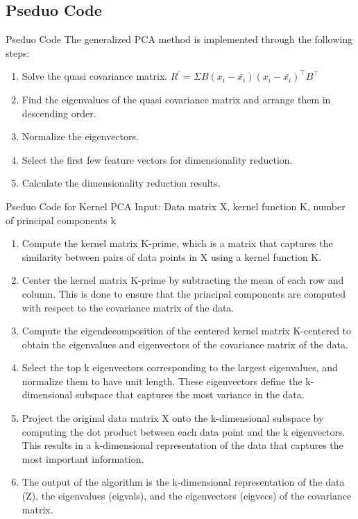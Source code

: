 \documentclass{beamer}
\begin{document}
\subsection{Pseduo Code}
\begin{frame}{Pseduo Code}
    The generalized PCA method is implemented through the following steps:
    \begin{enumerate}
    \item Solve the quasi covariance matrix. \newline
    $R^\prime = \Sigma B(x_i - \bar{x_i})(x_i - \bar{x_i})^\top B^\top$
    \item Find the eigenvalues of the quasi covariance matrix and arrange them in descending order.
    \item Normalize the eigenvectors.
    \item Select the first few feature vectors for dimensionality reduction.
    \item Calculate the dimensionality reduction results.
    \end{enumerate}
\end{frame}

\begin{frame}[allowframebreaks]{Pseduo Code for Kernel PCA}
    Input: Data matrix X, kernel function K, \newline number of principal components k
    \begin{enumerate}
    \item Compute the kernel matrix K-prime, which is a matrix that captures the similarity between pairs of data points in X using a kernel function K.
    \item Center the kernel matrix K-prime by subtracting the mean of each row and column. This is done to ensure that the principal components are computed with respect to the covariance matrix of the data.
    \item Compute the eigendecomposition of the centered kernel matrix K-centered to obtain the eigenvalues and eigenvectors of the covariance matrix of the data.
    \item Select the top k eigenvectors corresponding to the largest eigenvalues, and normalize them to have unit length. These eigenvectors define the k-dimensional subspace that captures the most variance in the data.
    \item Project the original data matrix X onto the k-dimensional subspace by computing the dot product between each data point and the k eigenvectors. This results in a k-dimensional representation of the data that captures the most important information.
    \item The output of the algorithm is the k-dimensional representation of the data (Z), the eigenvalues (eigvals), and the eigenvectors (eigvecs) of the covariance matrix.
    \end{enumerate}
\end{frame}
\end{document}
